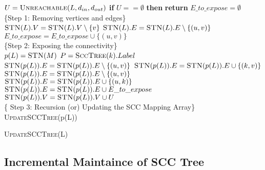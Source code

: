 \begin{algorithm}
    \SetAlgoLined
    $U = \text{\textsc{Unreachable}}(L, d_{in}, d_{out})$\;
    \textbf{if} {$U == \emptyset$} \textbf{then} \textbf{return}\;
    $E\_to\_expose = \emptyset$\;
    \hspace{1em}\\    \{Step 1: Removing vertices and edges\} \\
     {
        $\text{\textsc{STN}}(L).V = \text{\textsc{STN}}(L).V \setminus \{v\}$\;
    }
     {
         {
            $\text{\textsc{STN}}(L).E = \text{\textsc{STN}}(L).E \setminus \{(u, v)\}$\;
            $E\_to\_expose = E\_to\_expose \cup \{(u, v)\}$\;
        }
    }
    \phantom{text}\\   \{Step 2: Exposing the connectivity\} \\
     {
        $p(L) = \textsc{STN}(M)$\;
    }
     {
         {
            $P = \textsc{SccTree}(k).Label$\;
             {
                $\textsc{STN}(p(L)).E = \textsc{STN}(p(L)).E \setminus \{(u, v)\}$\;
                $\textsc{STN}(p(L)).E = \textsc{STN}(p(L)).E \cup \{(k, v)\}$\;
            }
             {
                $\textsc{STN}(p(L)).E = \textsc{STN}(p(L)).E \setminus \{(u, v)\}$\;
                $\textsc{STN}(p(L)).E = \textsc{STN}(p(L)).E \cup \{(u, k)\}$\;
            }
        }
    }
    $\textsc{STN}(p(L)).E = \textsc{STN}(p(L)).E \cup E\_to\_expose$\;
    $\textsc{STN}(p(L)).V = \textsc{STN}(p(L)).V \cup U$\;
    \phantom{text}\\   \{ Step 3: Recursion (or) Updating the SCC Mapping Array\} \\
     {
        \textsc{UpdateSCCTree}(p(L))\;
    }

    \caption{\textsc{UpdateSCCTree}(L)}
\end{algorithm}





\subsection{Incremental Maintaince of SCC Tree}\label{Subsec: Incremental Maintaince of SCC Tree}

